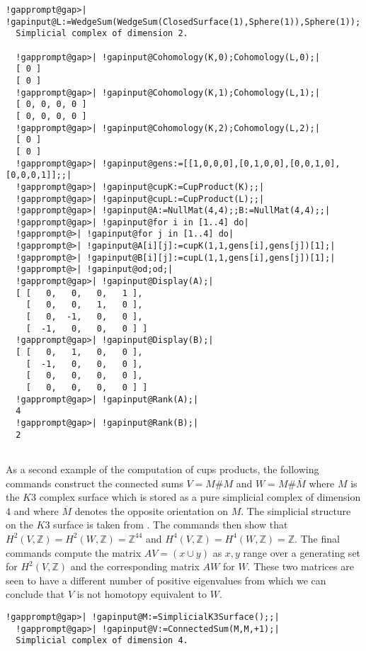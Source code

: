 \documentclass[a4paper,11pt]{report}
\begin{document}
{{\begin{Verbatim}[commandchars=!@|,fontsize=\small,frame=single,label=Example]
  !gapprompt@gap>| !gapinput@L:=WedgeSum(WedgeSum(ClosedSurface(1),Sphere(1)),Sphere(1));|
  Simplicial complex of dimension 2.
  
  !gapprompt@gap>| !gapinput@Cohomology(K,0);Cohomology(L,0);|
  [ 0 ]
  [ 0 ]
  !gapprompt@gap>| !gapinput@Cohomology(K,1);Cohomology(L,1);|
  [ 0, 0, 0, 0 ]
  [ 0, 0, 0, 0 ]
  !gapprompt@gap>| !gapinput@Cohomology(K,2);Cohomology(L,2);|
  [ 0 ]
  [ 0 ]
  !gapprompt@gap>| !gapinput@gens:=[[1,0,0,0],[0,1,0,0],[0,0,1,0],[0,0,0,1]];;|
  !gapprompt@gap>| !gapinput@cupK:=CupProduct(K);;|
  !gapprompt@gap>| !gapinput@cupL:=CupProduct(L);;|
  !gapprompt@gap>| !gapinput@A:=NullMat(4,4);;B:=NullMat(4,4);;|
  !gapprompt@gap>| !gapinput@for i in [1..4] do|
  !gapprompt@>| !gapinput@for j in [1..4] do|
  !gapprompt@>| !gapinput@A[i][j]:=cupK(1,1,gens[i],gens[j])[1];|
  !gapprompt@>| !gapinput@B[i][j]:=cupL(1,1,gens[i],gens[j])[1];|
  !gapprompt@>| !gapinput@od;od;|
  !gapprompt@gap>| !gapinput@Display(A);|
  [ [   0,   0,   0,   1 ],
    [   0,   0,   1,   0 ],
    [   0,  -1,   0,   0 ],
    [  -1,   0,   0,   0 ] ]
  !gapprompt@gap>| !gapinput@Display(B);|
  [ [   0,   1,   0,   0 ],
    [  -1,   0,   0,   0 ],
    [   0,   0,   0,   0 ],
    [   0,   0,   0,   0 ] ]
  !gapprompt@gap>| !gapinput@Rank(A);|
  4
  !gapprompt@gap>| !gapinput@Rank(B);|
  2
  
\end{Verbatim}
 

 As a second example of the computation of cups products, the following
commands construct the connected sums $V=M\# M$ and $W=M\# \overline M$ where $M$ is the $K3$ complex surface which is stored as a pure simplicial complex of dimension 4
and where $\overline M$ denotes the opposite orientation on $M$. The simplicial structure on the $K3$ surface is taken from \cite{spreerkhuenel}. The commands then show that $H^2(V,\mathbb Z)=H^2(W,\mathbb Z)=\mathbb Z^{44}$ and $H^4(V,\mathbb Z)=H^4(W,\mathbb Z)=\mathbb Z$. The final commands compute the matrix $AV=(x\cup y)$ as $x,y$ range over a generating set for $H^2(V,\mathbb Z)$ and the corresponding matrix $AW$ for $W$. These two matrices are seen to have a different number of positive
eigenvalues from which we can conclude that $V$ is not homotopy equivalent to $W$. 
\begin{Verbatim}[commandchars=!@|,fontsize=\small,frame=single,label=Example]
  !gapprompt@gap>| !gapinput@M:=SimplicialK3Surface();;|
  !gapprompt@gap>| !gapinput@V:=ConnectedSum(M,M,+1);|
  Simplicial complex of dimension 4.
  

\end{Verbatim}}}
\end{document}
